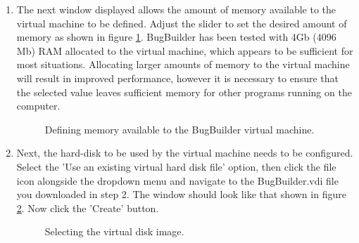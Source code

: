 \documentclass[a4paper,10pt]{article}
\begin{document}
\begin{enumerate}
\item The next window displayed allows the amount of memory available to the
virtual machine to be defined. Adjust the slider to set the desired amount of
memory as shown in figure \ref{fig:vm_install3}. BugBuilder has been tested with
4Gb (4096 Mb) RAM allocated to the virtual machine, which appears to be
sufficient for most situations. Allocating larger amounts of memory to the
virtual machine will result in improved performance, however it is necessary to
ensure that the selected value leaves sufficient memory for other programs
running on the computer.

\begin{figure}[H] 
\caption{Defining memory available to the BugBuilder virtual machine.}
\label{fig:vm_install3} \end{figure}

\item Next, the hard-disk to be used by the virtual machine needs to be
configured. Select the 'Use an existing virtual hard disk file' option, then
click the file icon alongside the dropdown menu and navigate to the
BugBuilder.vdi file you downloaded in step 2. The window should look like that
shown in figure \ref{fig:vm_install4}. Now click the 'Create' button.

\begin{figure}[H] 
\caption{Selecting the virtual disk image.} \label{fig:vm_install4} \end{figure}


\end{enumerate}
\end{document}
